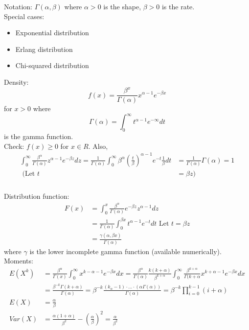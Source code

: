 \documentclass[10pt,letterpaper]{article}
\begin{document}
					Notation: $\Gamma(\alpha, \beta)$ where $\alpha>0$ is the shape, $\beta>0$ is the rate.\\
					
					Special cases:
					\begin{itemize}
						\item Exponential distribution
						\item Erlang distribution
						\item Chi-squared distribution
					\end{itemize}
					
					Density: \[f(x)=\frac{\beta^x}{\Gamma(\alpha)}x^{\alpha-1}e^{-\beta x}\] for $x>0$ where $$\Gamma(\alpha)=\int_0^{\infty}t^{\alpha-1}e^{-\infty}dt$$ is the gamma function.\\
					
					Check: $f(x)\geq 0$ for $x\in R$. Also,
					\begin{align*}
						\int_0^{\infty}\frac{\beta^{\alpha}}{\Gamma(\alpha)}z^{\alpha-1}e^{-\beta z}dz=\frac{1}{\Gamma(\alpha)}\int_0^{\infty}\beta^{\alpha}(\frac{t}{\beta})^{\alpha-1}e^{-t}\frac{1}{\beta}dt
						&=\frac{1}{\Gamma(\alpha)}\Gamma(\alpha)=1\\
						\mbox{ (Let $t$}&\mbox{$=\beta z$)}\\
					\end{align*}\\
					
					Distribution function:
							\begin{align*}
								F(x)&=\int_0^x\frac{\beta^{\alpha}}{\Gamma(\alpha)}e^{-\beta z}z^{\alpha-1}dz\\
								&=\frac{1}{\Gamma(\alpha)}\int_0^{\beta x}t^{\alpha-1}e^{-t}dt\mbox{ Let $t=\beta z$}\\
								&=\frac{\gamma(\alpha, \beta x)}{\Gamma(\alpha)}
							\end{align*}
							where $\gamma$ is the lower incomplete gamma function (available numerically).\\
							
					Moments:
							\begin{align*}
								E(X^k)&=\frac{\beta^{\alpha}}{\Gamma(x)}\int_0^{\infty}x^{k-\alpha-1}e^{-\beta x}dx
								=\frac{\beta^{\alpha}}{\Gamma(\alpha)}\frac{k(k+\alpha)}{\beta^{k+\alpha}}\int_0^{\infty}\frac{\beta^{k+\alpha}}{\Gamma(k+\alpha}x^{k+\alpha-1}e^{-\beta x}dx\\
								&=\frac{\beta^{-k}\Gamma(k+\alpha)}{\Gamma(\alpha)}
								=\beta^{-k}\frac{(k_\alpha-1)\cdot\dots\cdot(\alpha\Gamma(\alpha))}{\Gamma(\alpha)}
								=\beta^{-k}\prod_{i=0}^{k-1}(i+\alpha)\\
								E(X)&=\frac{\alpha}{\beta}\\
								Var(X)&=\frac{\alpha(1+\alpha)}{\beta^2}-(\frac{\alpha}{\beta})^2
								=\frac{\alpha}{\beta^2}
							\end{align*}
\end{document}

